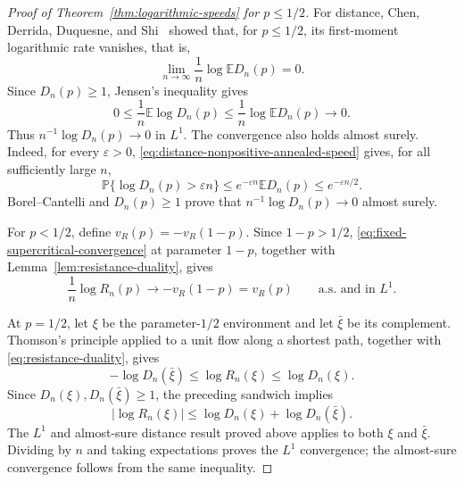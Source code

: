 \documentclass[12pt]{amsart}
\numberwithin{equation}{section}
\theoremstyle{plain}
\theoremstyle{definition}
\newcommand{\E}{\mathbb E}
\newcommand{\Pp}{\mathbb P}
\begin{document}
\begin{proof}[Proof of Theorem~\ref{thm:logarithmic-speeds}
for $p\le 1/2$]
For distance, Chen, Derrida, Duquesne, and
Shi~\cite{ChenDerridaDuquesneShi2026} showed that, for $p\le1/2$, its
first-moment logarithmic rate vanishes, that is,
\begin{equation}
 \lim_{n\to\infty}\frac1n\log\E D_n(p)=0.
 \label{eq:distance-nonpositive-annealed-speed}
\end{equation}
Since $D_n(p)\ge1$,
Jensen's inequality gives
\[
 0\le \frac1n\E\log D_n(p)
 \le \frac1n\log\E D_n(p)\longrightarrow0.
\]
Thus $n^{-1}\log D_n(p)\to0$ in $L^1$.
The convergence also holds almost surely.  Indeed, for every
$\varepsilon>0$,
\eqref{eq:distance-nonpositive-annealed-speed} gives, for all sufficiently
large $n$,
\[
 \Pp\{\log D_n(p)>\varepsilon n\}
 \le e^{-\varepsilon n}\E D_n(p)
 \le e^{-\varepsilon n/2}.
\]
Borel--Cantelli and $D_n(p)\ge1$ prove that
$n^{-1}\log D_n(p)\to0$ almost surely.

For $p<1/2$, define $v_R(p)=-v_R(1-p)$.  Since $1-p>1/2$,
\eqref{eq:fixed-supercritical-convergence} at parameter $1-p$,
together with Lemma~\ref{lem:resistance-duality}, gives
\[
 \frac1n\log R_n(p)\longrightarrow-v_R(1-p)=v_R(p)
\qquad\text{a.s. and in }L^1.
\]

At $p=1/2$, let $\xi$ be the parameter-$1/2$ environment and let $\bar\xi$ be its
complement.  Thomson's principle applied to a unit flow along a shortest path,
together with \eqref{eq:resistance-duality}, gives
\[
 -\log D_n(\bar\xi)
 \le \log R_n(\xi)
 \le \log D_n(\xi).
\]
Since $D_n(\xi),D_n(\bar\xi)\ge1$, the preceding sandwich implies
\[
 |\log R_n(\xi)|
 \le \log D_n(\xi)+\log D_n(\bar\xi).
\]
The $L^1$ and almost-sure distance result proved above applies to both $\xi$
and $\bar\xi$.  Dividing by $n$ and taking expectations proves the $L^1$
convergence; the almost-sure convergence follows from the same inequality.
\end{proof}
\end{document}
